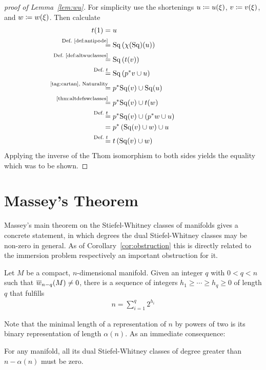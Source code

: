 \begin{proof}[proof of Lemma~\ref{lem:wu}]
  For simplicity use the shortenings
  $u\coloneqq {u}(\xi)$,
  $v\coloneqq {v}(\xi)$, and
  $w\coloneqq {w}(\xi)$.
  Then calculate
  \begin{align*}
    \thomiso(1)
    &= \U
    \\
    &\equalsby{Def.~\ref{def:antipode}}
      \SQ\left(\antipode(\SQ)(\U)\right)
    \\
    &\equalsby{Def.~\ref{def:altwuclasses}}
      \SQ\left(\thomiso(\Vu)\right)
    \\
    &\equalsby{Def.~$\thomiso$}
      \SQ\left(\pb p\Vu \cup \U\right)
    \\
    &\equalsby{\ref{tag:cartan}, Naturality}
      \pb p\SQ(\Vu) \cup \SQ(\U)
    \\
    &\equalsby{\ref{thm:altdefswclasses}}
      \pb p\SQ(\Vu) \cup \thomiso(\Ws)
    \\
    &\equalsby{Def.~$\thomiso$}
      \pb p\SQ(\Vu) \cup \left(\pb p \Ws \cup \U\right)
    \\
    &=
      \pb p\left(\SQ(\Vu) \cup \Ws\right) \cup \U
    \\
    &\equalsby{Def.~$\thomiso$}
      \thomiso\left(\SQ(\Vu) \cup \Ws\right)
  \end{align*}
  Applying the inverse of the Thom isomorphism to both sides
  yields the equality which was to be shown.
\end{proof}


\section{Massey's Theorem}
\label{sec:massey}
Massey's main theorem on the Stiefel-Whitney classes of manifolds
\cite[Theorem~I.]{massey} gives a concrete statement, in which degrees
the dual Stiefel-Whitney classes may be non-zero in general.
As of Corollary~\ref{cor:obstruction} this is directly related to the
immersion problem respectively an important obstruction for it.
\begin{Thm}[Massey]\label{thm:massey}  
  Let $M$ be a compact, $n$-dimensional manifold.
  Given an integer $q$ with $0<q<n$ such that ${\overline{w}_{n-q}}(M)\neq0$,
  there is a sequence of integers $h_1\geq\dotsb\geq h_q\geq0$ of
  length $q$ that fulfills
  \begin{gather*}
    n = \sum_{i=1}^{q} 2^{h_i}
  \end{gather*}
\end{Thm}
Note that the minimal length of a representation of $n$ by
powers of two is its binary representation of length $\alpha(n)$.
As an immediate consequence:
\begin{Cor}
  For any manifold, all its dual Stiefel-Whitney classes of degree
  greater than $n-\alpha(n)$ must be zero.
\end{Cor}

